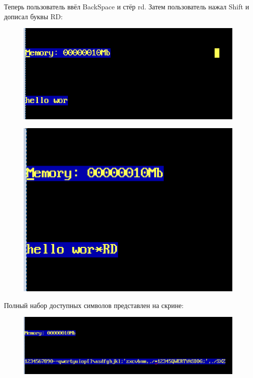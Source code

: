 Теперь пользователь ввёл BackSpace и стёр rd. Затем пользователь нажал Shift и дописал буквы RD:

\begin{figure}[!h]
	\begin{center}
		\includegraphics[width=16cm]{inc/protectedmode2.png}
	\end{center}
\end{figure}


\begin{figure}[!h]
	\begin{center}
		\includegraphics[width=16cm]{inc/protectedmode3.png}
	\end{center}
\end{figure}

\clearpage

Полный набор доступных символов представлен на скрине:

\begin{figure}[!h]
	\begin{center}
		\includegraphics[width=16cm]{inc/protectedmode4.png}
	\end{center}
\end{figure}

